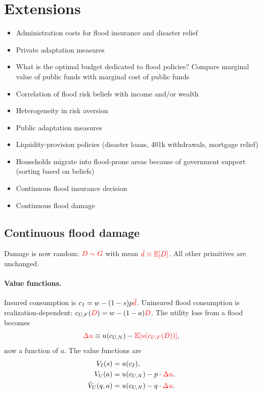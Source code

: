 \documentclass[12pt]{article}
\begin{document}
\section{Extensions}
\begin{itemize}
    \item Administration costs for flood insurance and disaster relief
    \item Private adaptation measures
    \item What is the optimal budget dedicated to flood policies? Compare marginal value of public funds with marginal cost of public funds
    \item Correlation of flood risk beliefs with income and/or wealth
    \item Heterogeneity in risk aversion
    \item Public adaptation measures
    \item Liquidity-provision policies (disaster loans, 401k withdrawals, mortgage relief)
    \item Households migrate into flood-prone areas because of government support (sorting based on beliefs)
    \item Continuous flood insurance decision
    \item Continuous flood damage
\end{itemize}

\subsection{Continuous flood damage}

Damage is now random: $\textcolor{red}{D\sim G}$ with mean $\textcolor{red}{\bar{d}\equiv\mathbb{E}[D]}$. All other primitives are unchanged.

\paragraph{Value functions.}
Insured consumption is $c_I=w-(1-s)p\textcolor{red}{\bar{d}}$. Uninsured flood consumption is realization-dependent: $c_{U,F}(\textcolor{red}{D})=w-(1-a)\textcolor{red}{D}$. The utility loss from a flood becomes
\[
    \textcolor{red}{\Delta u} \equiv u(c_{U,N}) - \textcolor{red}{\mathbb{E}[u(c_{U,F}(D))]},
\]
now a function of $a$. The value functions are
\begin{align}
    V_I(s) &= u(c_I), \\
    V_U(a) &= u(c_{U,N}) - p\cdot\textcolor{red}{\Delta u}, \\
    \tilde{V}_U(q,a) &= u(c_{U,N}) - q\cdot\textcolor{red}{\Delta u}.
\end{align}
\end{document}
